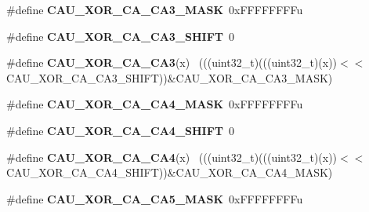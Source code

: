 \begin{DoxyCompactItemize}
\item 
\hypertarget{group___c_a_u___register___masks_gac7b046ce31fba66e970b3459c24a10f9}{}\#define {\bfseries C\+A\+U\+\_\+\+X\+O\+R\+\_\+\+C\+A\+\_\+\+C\+A3\+\_\+\+M\+A\+S\+K}~0x\+F\+F\+F\+F\+F\+F\+F\+Fu\label{group___c_a_u___register___masks_gac7b046ce31fba66e970b3459c24a10f9}

\item 
\hypertarget{group___c_a_u___register___masks_ga524188c17d8d070ce35b78f3a1bd8d89}{}\#define {\bfseries C\+A\+U\+\_\+\+X\+O\+R\+\_\+\+C\+A\+\_\+\+C\+A3\+\_\+\+S\+H\+I\+F\+T}~0\label{group___c_a_u___register___masks_ga524188c17d8d070ce35b78f3a1bd8d89}

\item 
\hypertarget{group___c_a_u___register___masks_ga73d487aa3b94bd1a04df9581f0f044f2}{}\#define {\bfseries C\+A\+U\+\_\+\+X\+O\+R\+\_\+\+C\+A\+\_\+\+C\+A3}(x)                                            ~(((uint32\+\_\+t)(((uint32\+\_\+t)(x))$<$$<$C\+A\+U\+\_\+\+X\+O\+R\+\_\+\+C\+A\+\_\+\+C\+A3\+\_\+\+S\+H\+I\+F\+T))\&C\+A\+U\+\_\+\+X\+O\+R\+\_\+\+C\+A\+\_\+\+C\+A3\+\_\+\+M\+A\+S\+K)\label{group___c_a_u___register___masks_ga73d487aa3b94bd1a04df9581f0f044f2}

\item 
\hypertarget{group___c_a_u___register___masks_gac44f628ba27da8192d8e570f745e5a0d}{}\#define {\bfseries C\+A\+U\+\_\+\+X\+O\+R\+\_\+\+C\+A\+\_\+\+C\+A4\+\_\+\+M\+A\+S\+K}~0x\+F\+F\+F\+F\+F\+F\+F\+Fu\label{group___c_a_u___register___masks_gac44f628ba27da8192d8e570f745e5a0d}

\item 
\hypertarget{group___c_a_u___register___masks_gad185523c9ec94202cae6663e3a76423f}{}\#define {\bfseries C\+A\+U\+\_\+\+X\+O\+R\+\_\+\+C\+A\+\_\+\+C\+A4\+\_\+\+S\+H\+I\+F\+T}~0\label{group___c_a_u___register___masks_gad185523c9ec94202cae6663e3a76423f}

\item 
\hypertarget{group___c_a_u___register___masks_ga6a0b0e637f3a940bc9fb82abd0069c4f}{}\#define {\bfseries C\+A\+U\+\_\+\+X\+O\+R\+\_\+\+C\+A\+\_\+\+C\+A4}(x)                                            ~(((uint32\+\_\+t)(((uint32\+\_\+t)(x))$<$$<$C\+A\+U\+\_\+\+X\+O\+R\+\_\+\+C\+A\+\_\+\+C\+A4\+\_\+\+S\+H\+I\+F\+T))\&C\+A\+U\+\_\+\+X\+O\+R\+\_\+\+C\+A\+\_\+\+C\+A4\+\_\+\+M\+A\+S\+K)\label{group___c_a_u___register___masks_ga6a0b0e637f3a940bc9fb82abd0069c4f}

\item 
\hypertarget{group___c_a_u___register___masks_ga74cbc0141ce46b620019e18b8eb2f908}{}\#define {\bfseries C\+A\+U\+\_\+\+X\+O\+R\+\_\+\+C\+A\+\_\+\+C\+A5\+\_\+\+M\+A\+S\+K}~0x\+F\+F\+F\+F\+F\+F\+F\+Fu\label{group___c_a_u___register___masks_ga74cbc0141ce46b620019e18b8eb2f908}


\end{DoxyCompactItemize}
